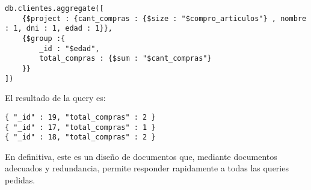 \begin{verbatim}
db.clientes.aggregate([
    {$project : {cant_compras : {$size : "$compro_articulos"} , nombre : 1, dni : 1, edad : 1}},
    {$group :{
        _id : "$edad",
        total_compras : {$sum : "$cant_compras"}
    }}
])
\end{verbatim}

El resultado de la query es:

\begin{verbatim}
{ "_id" : 19, "total_compras" : 2 }
{ "_id" : 17, "total_compras" : 1 }
{ "_id" : 18, "total_compras" : 2 }
\end{verbatim}

En definitiva, este es un diseño de documentos que, mediante documentos adecuados y redundancia, permite responder rapidamente a todas las queries pedidas.
